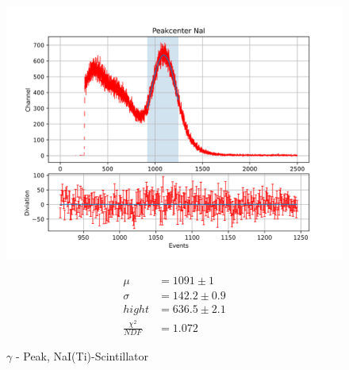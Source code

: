 \documentclass[12pt,twoside,a4paper]{scrartcl}
\begin{document}
			\begin{figure}[H]
					\begin{minipage}{0.69 \textwidth}
						\includegraphics[width = \textwidth]{Plots/Scinti/PeakNaIBest.png}
					\end{minipage}
					\begin{minipage}{0.29 \textwidth}
						\begin{align*}
							\mu &= 1091 \pm 1 \\
							\sigma &= 142.2 \pm 0.9 \\
                            hight &= 636.5 \pm 2.1 \\
							\frac{\chi^2}{NDF} &= 1.072
						\end{align*}
					\end{minipage}
                    \caption{$\gamma$ - Peak, NaI(Ti)-Scintillator}
				\end{figure}
\end{document}
